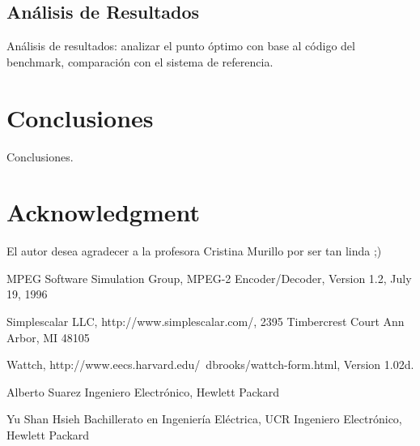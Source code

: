 \documentclass[journal]{IEEEtran}
\begin{document}
\subsection{An\'{a}lisis de Resultados}
An\'{a}lisis de resultados: analizar el punto \'{o}ptimo con base al c\'{o}digo del benchmark, comparaci\'{o}n con el sistema de referencia.

\section{Conclusiones}
Conclusiones.

\section*{Acknowledgment}


El autor desea agradecer a la profesora Cristina Murillo por ser tan linda ;)

\begin{thebibliography}{1}
MPEG Software Simulation Group, MPEG-2 Encoder/Decoder, Version 1.2, July 19, 1996

Simplescalar LLC, http://www.simplescalar.com/, 2395 Timbercrest Court Ann Arbor, MI 48105

Wattch, http://www.eecs.harvard.edu/~dbrooks/wattch-form.html, Version 1.02d.

\end{thebibliography}

\begin{IEEEbiographynophoto}{Alberto Suarez}
Ingeniero Electr\'{o}nico, Hewlett Packard
\end{IEEEbiographynophoto}

\begin{IEEEbiographynophoto}{Yu Shan Hsieh}
Bachillerato en Ingenier\'{i}a El\'{e}ctrica, UCR
Ingeniero Electr\'{o}nico, Hewlett Packard
\end{IEEEbiographynophoto}
\end{document}
